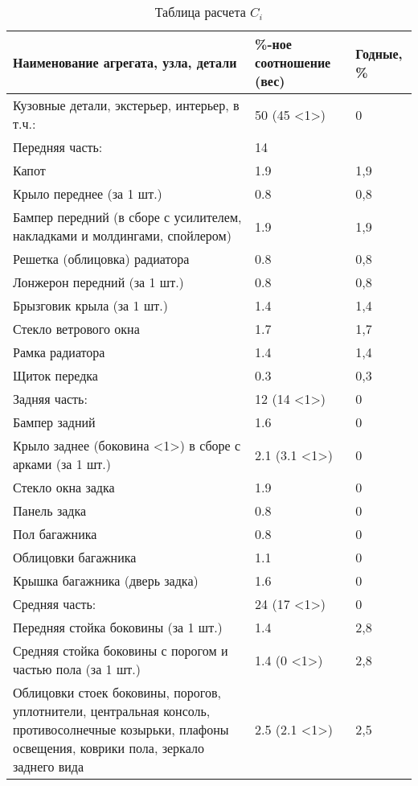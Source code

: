   \begin{longtable}{|p{9cm}|p{4cm}|p{2cm}|}
 	\caption[]{\footnotesize {Таблица расчета $ C_i $ }}
 	 \label{tab:7}\\
 	 \hline
 	 		Наименование агрегата, узла, детали & \%-ное соотношение (вес)  & Годные, \% \\
 	 		\hline \endhead
 		Кузовные детали, экстерьер, интерьер, в т.ч.: & 50 (45 \textless{}1\textgreater{}) & 0 \\
 		Передняя часть: & 14 &  \\
 		Капот & 1.9 & 1,9 \\
 		Крыло переднее (за 1 шт.) & 0.8 & 0,8 \\
 		Бампер передний (в сборе с усилителем, накладками и молдингами, спойлером) & 1.9 & 1,9 \\
 		Решетка (облицовка) радиатора & 0.8 & 0,8 \\
 		Лонжерон передний (за 1 шт.) & 0.8 & 0,8 \\
 		Брызговик крыла (за 1 шт.) & 1.4 & 1,4 \\
 		Стекло ветрового окна & 1.7 & 1,7 \\
 		Рамка радиатора & 1.4 & 1,4 \\
 		Щиток передка & 0.3 & 0,3 \\
 		Задняя часть: & 12 (14 \textless{}1\textgreater{}) & 0 \\
 		Бампер задний & 1.6 & 0 \\
 		Крыло заднее (боковина \textless{}1\textgreater{}) в сборе с арками (за 1 шт.) & 2.1 (3.1 \textless{}1\textgreater{}) & 0 \\
 		Стекло окна задка & 1.9 & 0 \\
 		Панель задка & 0.8 & 0 \\
 		Пол багажника & 0.8 & 0 \\
 		Облицовки багажника & 1.1 & 0 \\
 		Крышка багажника (дверь задка) & 1.6 & 0 \\
 		Средняя часть: & 24 (17 \textless{}1\textgreater{}) & 0 \\
 		Передняя стойка боковины (за 1 шт.) & 1.4 & 2,8 \\
 		Средняя стойка боковины с порогом и частью пола (за 1 шт.) & 1.4 (0 \textless{}1\textgreater{}) & 2,8 \\
 		Облицовки стоек боковины, порогов, уплотнители, центральная консоль, противосолнечные козырьки, плафоны освещения, коврики пола, зеркало заднего вида & 2.5 (2.1 \textless{}1\textgreater{}) & 2,5 \\

\end{longtable}
